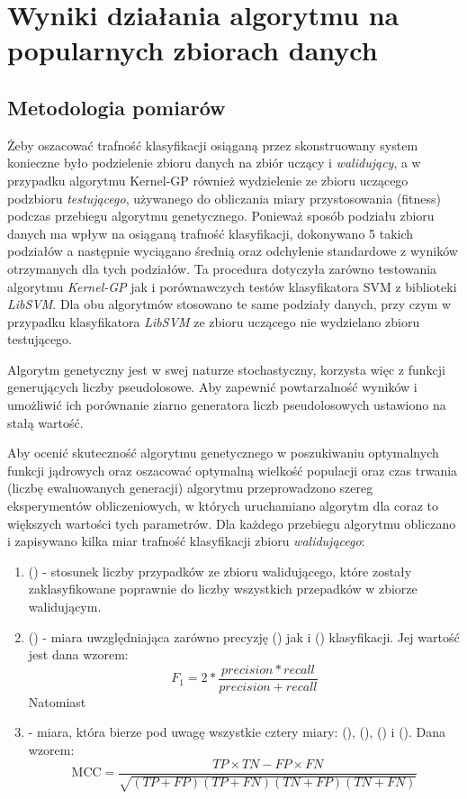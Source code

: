 
\chapter{Wyniki działania algorytmu na popularnych zbiorach danych}

\section{Metodologia pomiarów}
	Żeby oszacować trafność klasyfikacji osiąganą przez skonstruowany system konieczne było podzielenie zbioru danych na zbiór uczący i \emph{walidujący}, a w przypadku algorytmu Kernel-GP również wydzielenie ze zbioru uczącego podzbioru \emph{testującego}, używanego do obliczania miary przystosowania (fitness) podczas przebiegu algorytmu genetycznego. Ponieważ sposób podziału zbioru danych ma wpływ na osiąganą trafność klasyfikacji, dokonywano 5 takich podziałów a następnie wyciągano średnią oraz odchylenie standardowe z wyników otrzymanych dla tych podziałów. Ta procedura dotyczyła zarówno testowania algorytmu \emph{Kernel-GP} jak i porównawczych testów klasyfikatora SVM z biblioteki \emph{LibSVM}. Dla obu algorytmów stosowano te same podziały danych, przy czym w przypadku klasyfikatora \emph{LibSVM} ze zbioru uczącego nie wydzielano zbioru testującego.
	
	Algorytm genetyczny jest w swej naturze stochastyczny, korzysta więc z funkcji generujących liczby pseudolosowe. Aby zapewnić powtarzalność wyników i umożliwić ich porównanie ziarno generatora liczb pseudolosowych ustawiono na stałą wartość.

	Aby ocenić skuteczność algorytmu genetycznego w poszukiwaniu optymalnych funkcji jądrowych oraz oszacować optymalną wielkość populacji oraz czas trwania (liczbę ewaluowanych generacji) algorytmu przeprowadzono szereg eksperymentów obliczeniowych, w których uruchamiano algorytm dla coraz to większych wartości tych parametrów. Dla każdego przebiegu algorytmu obliczano i zapisywano kilka miar trafność klasyfikacji zbioru \emph{walidującego}:
	\begin{enumerate}
		\item {} () - stosunek liczby przypadków ze zbioru walidującego, które zostały zaklasyfikowane poprawnie do liczby wszystkich przepadków w zbiorze walidującym.

		\item {} () - 	miara uwzględniająca zarówno precyzję () jak i  () klasyfikacji. Jej wartość jest dana wzorem:
		$$ F_{1} = 2 * \frac{precision * recall}{precision + recall} $$
		Natomiast 
		
		\item {} - miara, która bierze pod uwagę wszystkie cztery miary:  (), (),  () i (). Dana wzorem: 
		$$ \text{MCC} = \frac{ TP \times TN - FP \times FN } {\sqrt{ (TP + FP) ( TP + FN ) ( TN + FP ) ( TN + FN ) } } $$
	\end{enumerate}

